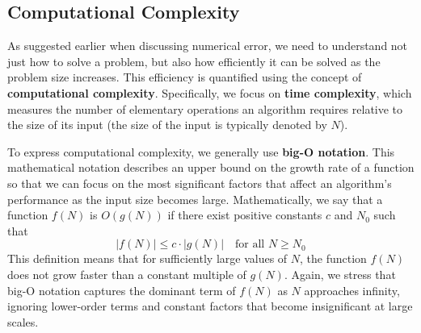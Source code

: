 \subsection{Computational Complexity}
As suggested earlier when discussing numerical error, we need to understand not just how to solve a problem, but also how efficiently it can be solved as the problem size increases. This efficiency is quantified using the concept of \textbf{computational complexity}. Specifically, we focus on \textbf{time complexity}, which measures the number of elementary operations an algorithm requires relative to the size of its input (the size of the input is typically denoted by $N$).

To express computational complexity, we generally use \textbf{big-O notation}. This mathematical notation describes an upper bound on the growth rate of a function so that we can focus on the most significant factors that affect an algorithm's performance as the input size becomes large. Mathematically, we say that a function $f(N)$ is $O(g(N))$ if there exist positive constants $c$ and $N_0$ such that
\begin{equation*}
    \left|f(N)\right| \leq c \cdot \left|g(N)\right| \quad \text{for all } N \geq N_0
\end{equation*}
This definition means that for sufficiently large values of $N$, the function $f(N)$ does not grow faster than a constant multiple of $g(N)$. Again, we stress that big-O notation captures the dominant term of $f(N)$ as $N$ approaches infinity, ignoring lower-order terms and constant factors that become insignificant at large scales.

